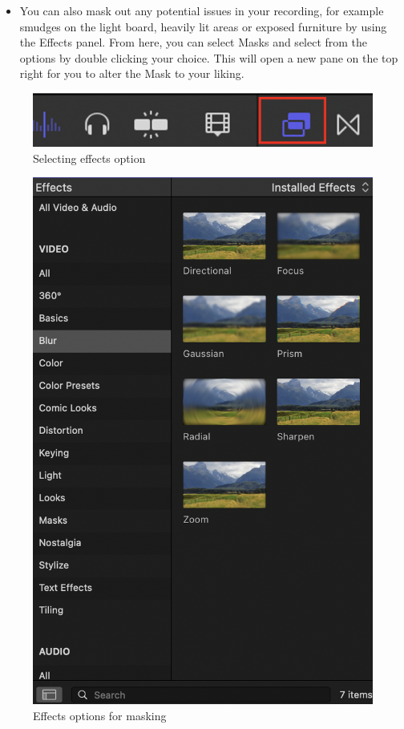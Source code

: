 \documentclass[
]{book}
\providecommand{\tightlist}{%
  \setlength{\itemsep}{0pt}\setlength{\parskip}{0pt}}
\begin{document}
\begin{itemize}
\tightlist
\item
  You can also mask out any potential issues in your recording, for example smudges on the light board, heavily lit areas or exposed furniture by using the Effects panel. From here, you can select Masks and select from the options by double clicking your choice. This will open a new pane on the top right for you to alter the Mask to your liking.
\end{itemize}

\begin{figure}

{\centering \includegraphics[width=0.6\linewidth]{Effects} 

}

\caption{Selecting effects option}\label{fig:effects}
\end{figure}

\begin{figure}

{\centering \includegraphics[width=1\linewidth]{EOptions} 

}

\caption{Effects options for masking}\label{fig:eoptions}
\end{figure}
\end{document}
